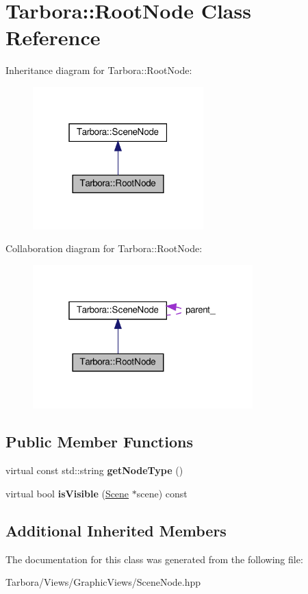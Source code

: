 \hypertarget{classTarbora_1_1RootNode}{}\section{Tarbora\+:\+:Root\+Node Class Reference}
\label{classTarbora_1_1RootNode}


Inheritance diagram for Tarbora\+:\+:Root\+Node\+:
\nopagebreak
\begin{figure}[H]
\begin{center}
\leavevmode
\includegraphics[width=187pt]{classTarbora_1_1RootNode__inherit__graph}
\end{center}
\end{figure}


Collaboration diagram for Tarbora\+:\+:Root\+Node\+:
\nopagebreak
\begin{figure}[H]
\begin{center}
\leavevmode
\includegraphics[width=241pt]{classTarbora_1_1RootNode__coll__graph}
\end{center}
\end{figure}
\subsection*{Public Member Functions}
\begin{DoxyCompactItemize}
\item 
\mbox{\label{classTarbora_1_1RootNode_aa95de585421b6eb9d0b7b1232856f9cf}} 
virtual const std\+::string {\bfseries get\+Node\+Type} ()
\item 
\mbox{\label{classTarbora_1_1RootNode_a77cc379a7cd2203da35004a2747d6f4d}} 
virtual bool {\bfseries is\+Visible} (\hyperlink{classTarbora_1_1Scene}{Scene} $\ast$scene) const
\end{DoxyCompactItemize}
\subsection*{Additional Inherited Members}


The documentation for this class was generated from the following file\+:\begin{DoxyCompactItemize}
\item 
Tarbora/\+Views/\+Graphic\+Views/Scene\+Node.\+hpp\end{DoxyCompactItemize}
